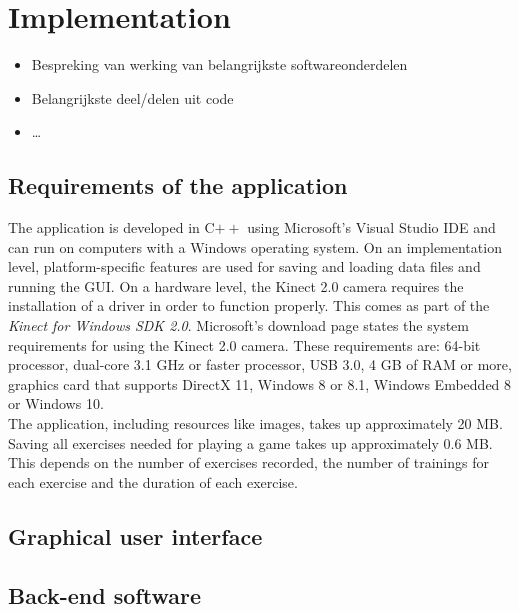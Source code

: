 \chapter{Implementation}

\begin{itemize}
\item Bespreking van werking van belangrijkste softwareonderdelen
\item Belangrijkste deel/delen uit code
\item \ldots
\end{itemize}


\section{Requirements of the application}

The application is developed in C$++$ using Microsoft's Visual Studio IDE and can run on computers with a Windows operating system. On an implementation level, platform-specific features are used for saving and loading data files and running the GUI. On a hardware level, the Kinect 2.0 camera requires the installation of a driver in order to function properly. This comes as part of the \emph{Kinect for Windows SDK 2.0}. Microsoft's download page states the system requirements for using the Kinect 2.0 camera. These requirements are: 64-bit processor, dual-core 3.1 GHz or faster processor, USB 3.0, 4 GB of RAM or more, graphics card that supports DirectX 11, Windows 8 or 8.1, Windows Embedded 8 or Windows 10.\\

The application, including resources like images, takes up approximately 20 MB. Saving all exercises needed for playing a game takes up approximately 0.6 MB. This depends on the number of exercises recorded, the number of trainings for each exercise and the duration of each exercise. 


\section{Graphical user interface}




\section{Back-end software}

